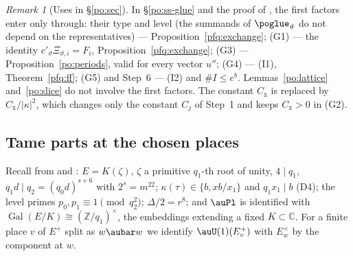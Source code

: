 \documentclass[10pt]{amsart}
\theoremstyle{definition}
\theoremstyle{remark}
\newtheorem{remark}[theorem]{Remark}
\newcommand{\C}{\mathbb C}
\newcommand{\Z}{\mathbb Z}
\begin{document}
\begin{remark}[Uses in \S\ref{po:sec}]\label{pfq:rem-uses}
In \S\ref{po:ss-glue} and the proof of {\cite[Proposition~14.41]{P46}}, the first factors enter only through: their type and level
(the summands of $\poglue_\vartheta$ do not depend on the representatives) --- Proposition~\ref{pfq:exchange}; (G1) --- the identity
$c'_\vartheta\Xi_{\vartheta,i}=F_i$, Proposition~\ref{pfq:exchange}; (G3) --- Proposition~\ref{po:periods}, valid for every vector $u''$; (G4) ---
(I1), Theorem~\ref{pfq:ff}; (G5) and Step~6 --- (I2) and $\#I\le e^b$. Lemmas~\ref{po:lattice} and~\ref{po:slice} do not involve the
first factors. The constant $C_{\mathrm x}$ is replaced by $C_{\mathrm x}/|\kappa|^2$, which changes only the constant $C_j$ of Step~1
and keeps $C_{\mathrm x}>0$ in (G2).
\end{remark}

\subsection{Tame parts at the chosen places}\label{pfq:ss-tame}

Recall from {\cite[Definition~13.3]{P46}} and {\cite[\S13.1]{P46}}: $E=K(\zeta)$, $\zeta$ a primitive $q_1$-th root of unity,
$4\mid q_1$, $q_1d\mid q_2=(q_0d)^{s+6}$ with $2^s=m^{22}$; $\kappa(\tau)\in\{b,xb/x_1\}$ and $q_1x_1\mid b$ (D4); the level primes
$p_0,p_1\equiv1\pmod{q_2^2}$; $\Delta/2=r^8$; and $\auPl$ is identified with $\operatorname{Gal}(E/K)\cong(\Z/q_1)^\times$, the
embeddings extending a fixed $K\subset\C$. For a finite place $v$ of $E^+$ split as $w\aubar w$ we identify
$\auU(1)(E^+_v)$ with $E_w^\times$ by the component at $w$.
\end{document}
